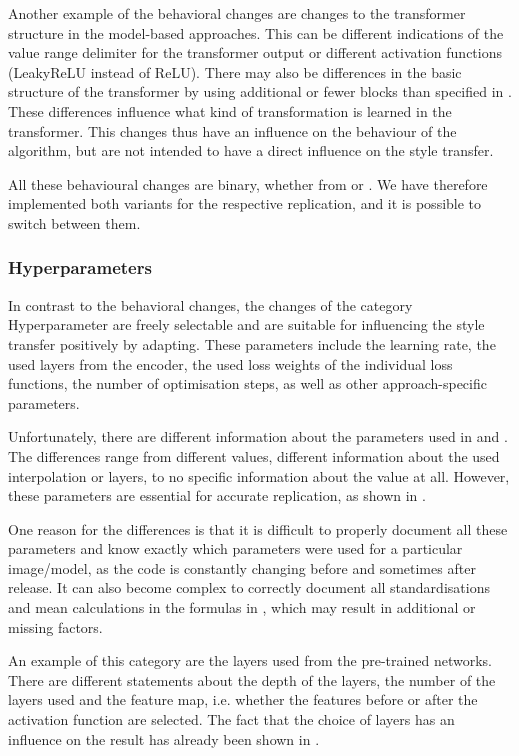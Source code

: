 Another example of the behavioral changes are changes to the transformer structure in the model-based approaches. This can be different indications of the value range delimiter for the transformer output or different activation functions (LeakyReLU instead of ReLU). There may also be differences in the basic structure of the transformer by using additional or fewer blocks than specified in \paper{}. These differences influence what kind of transformation is learned in the transformer. This changes thus have an influence on the behaviour of the algorithm, but are not intended to have a direct influence on the style transfer.

All these behavioural changes are binary, whether from \paper{} or \implementation{}. We have therefore implemented both variants for the respective replication, and it is possible to switch between them.

\subsubsection{Hyperparameters}
In contrast to the behavioral changes, the changes of the category Hyperparameter are freely selectable and are suitable for influencing the style transfer positively by adapting. These parameters include the learning rate, the used layers from the encoder, the used loss weights of the individual loss functions, the number of optimisation steps, as well as other approach-specific parameters. 

Unfortunately, there are different information about the parameters used in \paper{} and \implementation{}. The differences range from different values, different information about the used interpolation or layers, to no specific information about the value at all. However, these parameters are essential for accurate replication, as shown in . 

One reason for the differences is that it is difficult to properly document all these parameters and know exactly which parameters were used for a particular image/model, as the code is constantly changing before and sometimes after release. It can also become complex to correctly document all standardisations and mean calculations in the formulas in \paper{}, which may result in additional or missing factors. 

An example of this category are the layers used from the pre-trained networks. There are different statements about the depth of the layers, the number of the layers used and the feature map, i.e. whether the features before or after the activation function are selected. The fact that the choice of layers has an influence on the result has already been shown in . 

